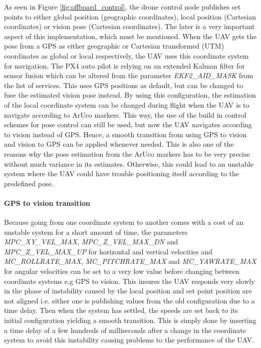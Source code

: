 \documentclass[../Head/report.tex]{subfiles}
\begin{document}
As seen in Figure \ref{fig:offboard_control}, the drone control node publishes set points to either global position (geographic coordinates), local position (Cartesian coordinates) or vision pose (Cartesian coordinates). The later is a very important aspect of this implementation, which must be mentioned. When the UAV gets the pose from a GPS as either   geographic or Cartesian transformed (UTM) coordinates as global or local respectively, the UAV uses this coordinate system for navigation. The PX4 auto pilot is relying on an extended Kalman filter for sensor fusion which can be altered from the parameter \textit{EKF2\_AID\_MASK} from the list of services. This uses GPS positions as default, but can be changed to fuse the estimated vision pose instead. By using this configuration, the estimation of the local coordinate system can be changed during flight when the UAV is to navigate according to ArUco markers. This way, the use of the build in control schemes for pose control can still be used, but now the UAV navigates according to vision instead of GPS. Hence, a smooth transition from using GPS to vision and vision to GPS can be applied whenever needed. This is also one of the reasons why the pose estimation from the ArUco markers has to be very precise without much variance in its estimates. Otherwise, this could lead to an unstable system where the UAV could have trouble positioning itself according to the predefined pose. 

\paragraph{GPS to vision transition}
\label{sec:gps_to_vision_transition}

Because going from one coordinate system to another comes with a cost of an unstable system for a short amount of time, the parameters \textit{MPC\_XY\_VEL\_MAX}, \textit{MPC\_Z\_VEL\_MAX\_DN} and  \textit{MPC\_Z\_VEL\_MAX\_UP} for horizontal and vertical velocities  and \textit{MC\_ROLLRATE\_MAX}, \textit{MC\_PITCHRATE\_MAX} and \textit{MC\_YAWRATE\_MAX} for angular velocities can be set to a very low value before changing between coordinate systems e.g GPS to vision. This insures the UAV responds very slowly in the phase of instability caused by the local position and set point position are not aligned i.e. either one is publishing values from the old configuration due to a time delay. Then when the system has settled, the speeds are set back to its initial configuration yielding a smooth transition. This is simply done by inserting a time delay of a few hundreds of milliseconds after a change in the coordinate system to avoid this instability causing problems to the performance of the UAV.
\end{document}
